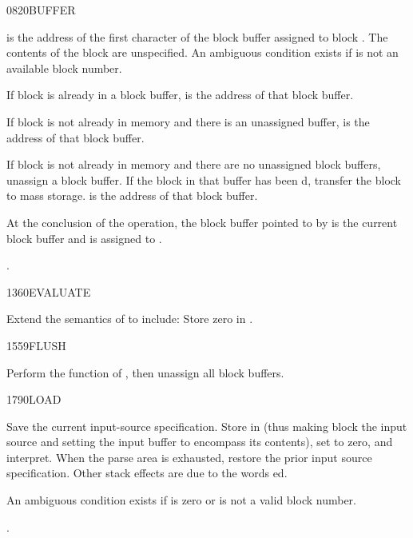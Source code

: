 \begin{worddef}{0820}{BUFFER}
\item {}

	 is the address of the first character of the
	block buffer assigned to block . The contents of the
	block are unspecified. An ambiguous condition exists if 
	is not an available block number.

	If block  is already in a block buffer, 
	is the address of that block buffer.

	If block  is not already in memory and there is an
	unassigned 	buffer,  is the address of that block
	buffer.

	If block  is not already in memory and there are no
	unassigned block buffers, unassign a block buffer. If the block
	in that buffer has been d, transfer the block to
	mass storage.  is the address of that block buffer.

	At the conclusion of the operation, the block buffer pointed to
	by  is the current block buffer and is assigned to
	.

\see {}.
\end{worddef}


\begin{worddef}{1360}{EVALUATE}
\item Extend the semantics of  to
	include: Store zero in .
\end{worddef}


\begin{worddef}{1559}{FLUSH}
\item \stack{}{}

	Perform the function of , then unassign all
	block buffers.
\end{worddef}


\begin{worddef}{1790}{LOAD}
\item {}

	Save the current input-source specification. Store  in
	 (thus making block  the input source and
	setting the input buffer to encompass its contents), set
	 to zero, and interpret. When the parse area is
	exhausted, restore the prior input source specification. Other
	stack effects are due to the words ed.

	An ambiguous condition exists if  is zero or is not a
	valid block number.

\see {}.
\end{worddef}

